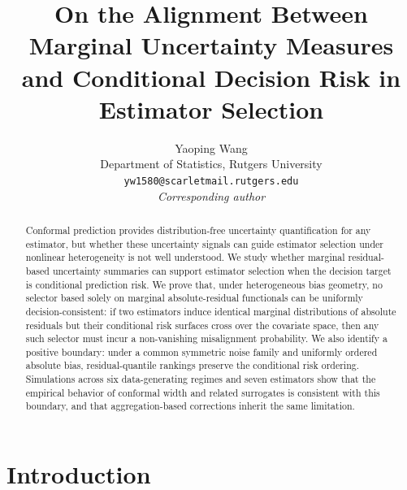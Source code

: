 \documentclass[a4paper,11pt]{article}
\begin{document}
\title{On the Alignment Between Marginal Uncertainty Measures and Conditional Decision Risk in Estimator Selection}

\author{Yaoping Wang\\
Department of Statistics, Rutgers University\\
\texttt{yw1580@scarletmail.rutgers.edu}\\
\small{\textit{Corresponding author}}}
\maketitle

\begin{abstract}
Conformal prediction provides distribution-free uncertainty quantification for any estimator, but whether these uncertainty signals can guide estimator selection under nonlinear heterogeneity is not well understood. We study whether marginal residual-based uncertainty summaries can support estimator selection when the decision target is conditional prediction risk. We prove that, under heterogeneous bias geometry, no selector based solely on marginal absolute-residual functionals can be uniformly decision-consistent: if two estimators induce identical marginal distributions of absolute residuals but their conditional risk surfaces cross over the covariate space, then any such selector must incur a non-vanishing misalignment probability. We also identify a positive boundary: under a common symmetric noise family and uniformly ordered absolute bias, residual-quantile rankings preserve the conditional risk ordering. Simulations across six data-generating regimes and seven estimators show that the empirical behavior of conformal width and related surrogates is consistent with this boundary, and that aggregation-based corrections inherit the same limitation.
\end{abstract}

\section{Introduction}
\label{sec:intro}
\end{document}
